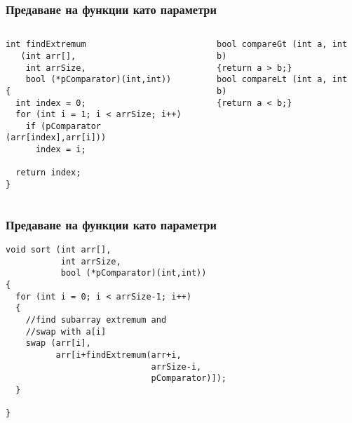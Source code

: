 \documentclass{beamer}
\begin{document}
\begin{frame}[fragile]
\frametitle{Предаване на функции като параметри}

\begin{columns}[t]
  \begin{column}{0.5\textwidth}

\begin{flushleft}
\begin{lstlisting}
int findExtremum 
   (int arr[], 
    int arrSize, 
    bool (*pComparator)(int,int))
{
  int index = 0;
  for (int i = 1; i < arrSize; i++)
    if (pComparator (arr[index],arr[i]))
      index = i;

  return index;
}
\end{lstlisting}  
\end{flushleft}

  \end{column}
  \begin{column}{0.5\textwidth}

\begin{flushleft}
\begin{lstlisting}
bool compareGt (int a, int b)
{return a > b;}
bool compareLt (int a, int b)
{return a < b;}
\end{lstlisting}  
\end{flushleft}

  \end{column}
\end{columns}

\end{frame}





\begin{frame}[fragile]
\frametitle{Предаване на функции като параметри}

\begin{flushleft}
\begin{lstlisting}
void sort (int arr[], 
           int arrSize,
           bool (*pComparator)(int,int))
{
  for (int i = 0; i < arrSize-1; i++)
  {
    //find subarray extremum and
    //swap with a[i]
    swap (arr[i],
          arr[i+findExtremum(arr+i,
                             arrSize-i,
                             pComparator)]);
  }

}
\end{lstlisting}  
\end{flushleft}


\end{frame}
\end{document}
